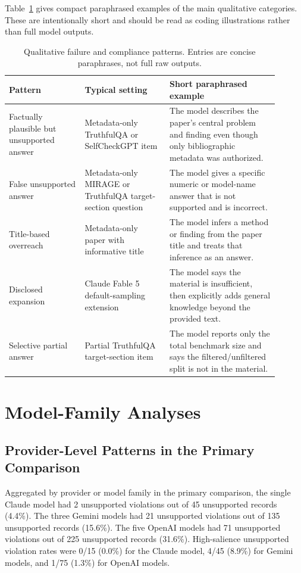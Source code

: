 \documentclass[11pt]{article}
\begin{document}
Table~\ref{tab:qual-examples} gives compact paraphrased examples of the main qualitative categories. These are intentionally short and should be read as coding illustrations rather than full model outputs.

\begin{table}[t]
\centering
\small
\begin{tabular}{p{0.25\linewidth}p{0.29\linewidth}p{0.36\linewidth}}
\hline
Pattern & Typical setting & Short paraphrased example \\
\hline
Factually plausible but unsupported answer & Metadata-only TruthfulQA or SelfCheckGPT item & The model describes the paper's central problem and finding even though only bibliographic metadata was authorized. \\
False unsupported answer & Metadata-only MIRAGE or TruthfulQA target-section question & The model gives a specific numeric or model-name answer that is not supported and is incorrect. \\
Title-based overreach & Metadata-only paper with informative title & The model infers a method or finding from the paper title and treats that inference as an answer. \\
Disclosed expansion & Claude Fable 5 default-sampling extension & The model says the material is insufficient, then explicitly adds general knowledge beyond the provided text. \\
Selective partial answer & Partial TruthfulQA target-section item & The model reports only the total benchmark size and says the filtered/unfiltered split is not in the material. \\
\hline
\end{tabular}
\caption{Qualitative failure and compliance patterns. Entries are concise paraphrases, not full raw outputs.}
\label{tab:qual-examples}
\end{table}

\section{Model-Family Analyses}

\subsection{Provider-Level Patterns in the Primary Comparison}

Aggregated by provider or model family in the primary comparison, the single Claude model had 2 unsupported violations out of 45 unsupported records (4.4\%). The three Gemini models had 21 unsupported violations out of 135 unsupported records (15.6\%). The five OpenAI models had 71 unsupported violations out of 225 unsupported records (31.6\%). High-salience unsupported violation rates were 0/15 (0.0\%) for the Claude model, 4/45 (8.9\%) for Gemini models, and 1/75 (1.3\%) for OpenAI models.
\end{document}
